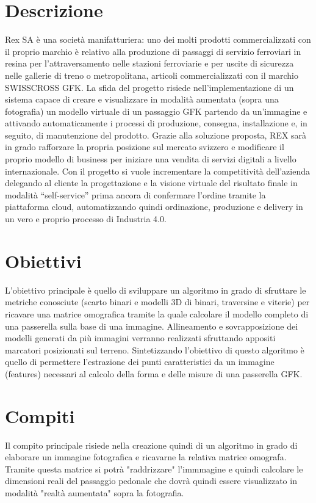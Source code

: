 \documentclass[twoside]{supsistudent}
\begin{document}
\section{Descrizione}
Rex SA è una società manifatturiera: uno dei molti prodotti commercializzati con il proprio marchio è relativo alla
produzione di passaggi di servizio ferroviari in resina per l’attraversamento nelle stazioni ferroviarie e per uscite di
sicurezza nelle gallerie di treno o metropolitana, articoli commercializzati con il marchio SWISSCROSS GFK.
La sfida del progetto risiede nell’implementazione di un sistema capace di creare e visualizzare in modalità aumentata
(sopra una fotografia) un modello virtuale di un passaggio GFK partendo da un'immagine e attivando automaticamente i
processi di produzione, consegna, installazione e, in seguito, di manutenzione del prodotto.
Grazie alla soluzione proposta, REX sarà in grado rafforzare la propria posizione sul mercato svizzero e modificare il
proprio modello di business per iniziare una vendita di servizi digitali a livello internazionale.
Con il progetto si vuole incrementare la competitività dell’azienda delegando al cliente la progettazione e la visione virtuale
del risultato finale in modalità “self-service” prima ancora di confermare l’ordine tramite la piattaforma cloud,
automatizzando quindi ordinazione, produzione e delivery in un vero e proprio processo di Industria 4.0.

\section{Obiettivi}
L'obiettivo principale è quello di sviluppare un algoritmo in grado di sfruttare le metriche conosciute (scarto binari e modelli
3D di binari, traversine e viterie) per ricavare una matrice omografica tramite la quale calcolare il modello completo di una passerella
sulla base di una immagine. Allineamento e sovrapposizione dei modelli generati da più immagini verranno realizzati sfruttando appositi marcatori
posizionati sul terreno. Sintetizzando l'obiettivo di questo algoritmo è quello di permettere l'estrazione dei punti caratteristici da 
un immagine (features) necessari al calcolo della forma e delle misure di una passerella GFK.

\section{Compiti}
Il compito principale risiede nella creazione quindi di un algoritmo in grado di elaborare un immagine fotografica e ricavarne la relativa matrice omografa.
Tramite questa matrice si potrà "raddrizzare" l'immmagine e quindi calcolare le dimensioni reali del passaggio pedonale
che dovrà quindi essere visualizzato in modalità "realtà aumentata" sopra la fotografia.
\end{document}
